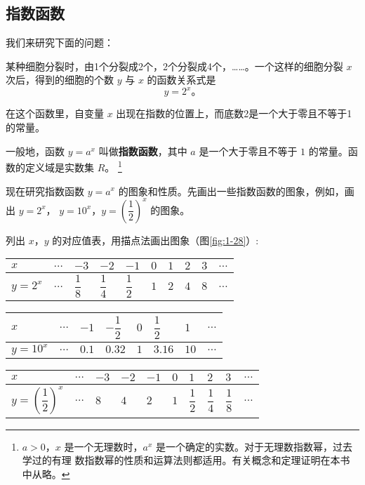 \subsection{指数函数}\label{subsec:1-12}

我们来研究下面的问题：

某种细胞分裂时，由1个分裂成2个，2个分裂成4个，……。一个这样的细胞分裂 $x$ 次后，得到的细胞的个数 $y$ 与 $x$ 的函数关系式是
$$y = 2^x \text{。}$$

在这个函数里，自变量 $x$ 出现在指数的位置上，而底数2是一个大于零且不等于1的常量。

一般地，函数 $y = a^x$ 叫做\textbf{指数函数}，其中 $a$ 是一个大于零且不等于 $1$ 的常量。函数的定义域是实数集 $R$。
\footnote{$a > 0$，$x$ 是一个无理数时，$a^x$ 是一个确定的实数。对于无理数指数幂，过去学过的有理
    数指数幂的性质和运算法则都适用。有关概念和定理证明在本书中从略。}

现在研究指数函数 $y = a^x$ 的图象和性质。先画出一些指数函数的图象，例如，画出 $y = 2^x$，
$y = 10^x$，$y = \left( \dfrac 1 2 \right)^x$ 的图象。

列出 $x$，$y$ 的对应值表，用描点法画出图象（图\ref{fig:1-28}）:

\begin{table}[H]
\renewcommand\arraystretch{2}
\begin{tabular}{|w{c}{5em}|*{9}{w{c}{2em}|}}
    \hline
    $x$ & $\dots$ & $-3$ & $-2$ & $-1$ & $0$ & $1$ & $2$ & $3$ & $\dots$ \\
    \hline
    $y=2^x$ & $\dots$ & $\dfrac 1 8$ & $\dfrac 1 4$ & $\dfrac 1 2$ & $1$ & $2$ & $4$ & $8$ & $\dots$ \\
    \hline
\end{tabular}
\end{table}

\begin{table}[H]
\renewcommand\arraystretch{2}
\begin{tabular}{|w{c}{5em}|*{7}{w{c}{2.9em}|}}
    \hline
    $x$ & $\dots$ & $-1$ & $-\dfrac 1 2$ & $0$ & $\dfrac 1 2$ & $1$ & $\dots$ \\
    \hline
    $y=10^x$ & $\dots$ & $0.1$ & $0.32$ & $1$ & $3.16$ & $10$ & $\dots$ \\
    \hline
\end{tabular}
\end{table}

\begin{table}[H]
\renewcommand\arraystretch{2}
\begin{tabular}{|w{c}{5em}|*{9}{w{c}{2em}|}}
    \hline
    $x$ & $\dots$ & $-3$ & $-2$ & $-1$ & $0$ & $1$ & $2$ & $3$ & $\dots$ \\
    \hline
    $y=\left( \dfrac 1 2 \right)^x$ & $\dots$ & $8$ & $4$ & $2$ & $1$ & $\dfrac 1 2$ & $\dfrac 1 4$ & $\dfrac 1 8$ & $\dots$ \\
    \hline
\end{tabular}
\end{table}

